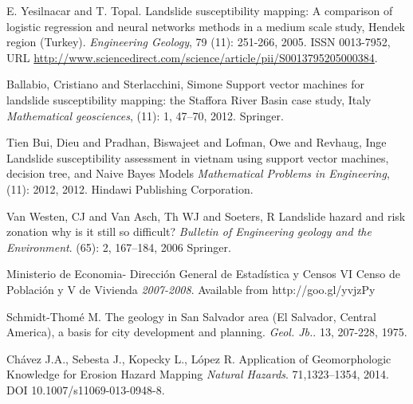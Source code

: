 \documentclass[11pt,twoside]{rmta2010esp}%
\begin{document}
\begin{thebibliography}{99}
E. Yesilnacar and T. Topal.
\newblock Landslide susceptibility mapping: A comparison of logistic regression and neural networks methods in a medium scale study, Hendek region (Turkey).
\newblock \emph{Engineering Geology}, 79
  (11): 251-266, 2005.
\newblock ISSN 0013-7952,
\newblock URL
  \url{http://www.sciencedirect.com/science/article/pii/S0013795205000384}.









Ballabio, Cristiano and Sterlacchini, Simone
\newblock Support vector machines for landslide susceptibility mapping: the Staffora River Basin case study, Italy
\newblock \emph{Mathematical geosciences},
  (11): 1, 47--70, 2012.
\newblock Springer. 



Tien Bui, Dieu and Pradhan, Biswajeet and Lofman, Owe and Revhaug, Inge
\newblock Landslide susceptibility assessment in vietnam using support vector machines, decision tree, and Naive Bayes Models
\newblock \emph{Mathematical Problems in Engineering},
  (11): 2012, 2012.
\newblock Hindawi Publishing Corporation.




Van Westen, CJ and Van Asch, Th WJ and Soeters, R
\newblock Landslide hazard and risk zonation why is it still so difficult?
\newblock \emph{Bulletin of Engineering geology and the Environment}.
(65): 2, 167--184, 2006
\newblock Springer. 





Ministerio de Economia- Direcci\'{o}n General de Estad\'{i}stica y Censos
\newblock VI Censo de Población y V de Vivienda
\newblock \emph{2007-2008}.
 Available from http://goo.gl/yvjzPy




Schmidt-Thom\'{e} M.
\newblock The geology in San Salvador area (El Salvador, Central America), a basis for city development and planning.
\newblock \emph{Geol. Jb.}.
 13, 207-228, 1975.


Ch\'{a}vez J.A., Sebesta J., Kopecky L., L\'{o}pez R.
\newblock Application of Geomorphologic Knowledge for Erosion Hazard Mapping
\newblock \emph{Natural Hazards}.
 71,1323–1354, 2014.
\newblock DOI 10.1007/s11069-013-0948-8.



\end{thebibliography}
\end{document}
